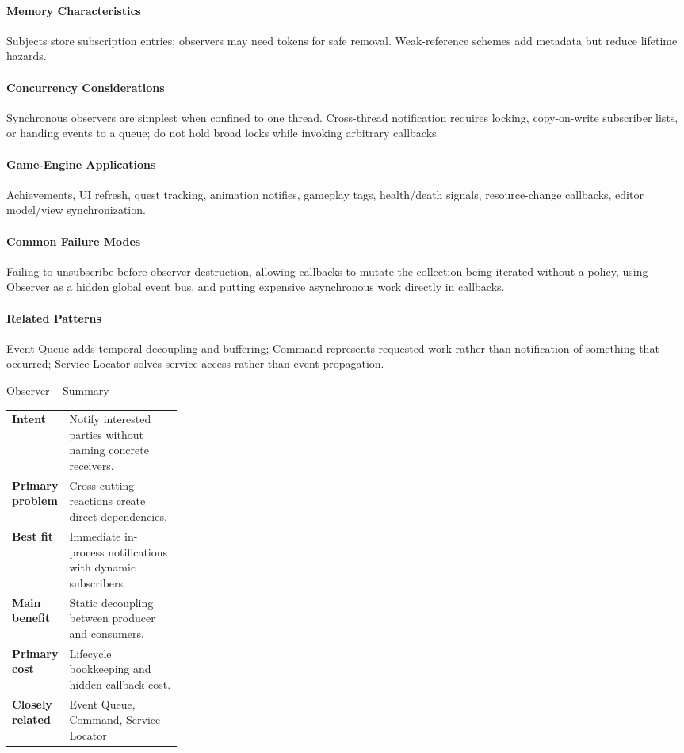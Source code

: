 \documentclass[11pt]{article}
\begin{document}
\paragraph{Memory Characteristics} Subjects store subscription entries; observers may need tokens for safe removal. Weak-reference schemes add metadata but reduce lifetime hazards.
\paragraph{Concurrency Considerations} Synchronous observers are simplest when confined to one thread. Cross-thread notification requires locking, copy-on-write subscriber lists, or handing events to a queue; do not hold broad locks while invoking arbitrary callbacks.
\paragraph{Game-Engine Applications} Achievements, UI refresh, quest tracking, animation notifies, gameplay tags, health/death signals, resource-change callbacks, editor model/view synchronization.
\paragraph{Common Failure Modes} Failing to unsubscribe before observer destruction, allowing callbacks to mutate the collection being iterated without a policy, using Observer as a hidden global event bus, and putting expensive asynchronous work directly in callbacks.
\paragraph{Related Patterns} Event Queue adds temporal decoupling and buffering; Command represents requested work rather than notification of something that occurred; Service Locator solves service access rather than event propagation.

\begin{patternsummary}{Observer -- Summary}
\begin{tabularx}{\linewidth}{@{}>{\bfseries}p{0.25\linewidth}X@{}}
Intent & Notify interested parties without naming concrete receivers. \\
Primary problem & Cross-cutting reactions create direct dependencies. \\
Best fit & Immediate in-process notifications with dynamic subscribers. \\
Main benefit & Static decoupling between producer and consumers. \\
Primary cost & Lifecycle bookkeeping and hidden callback cost. \\
Closely related & Event Queue, Command, Service Locator \\
\end{tabularx}
\end{patternsummary}
\end{document}

